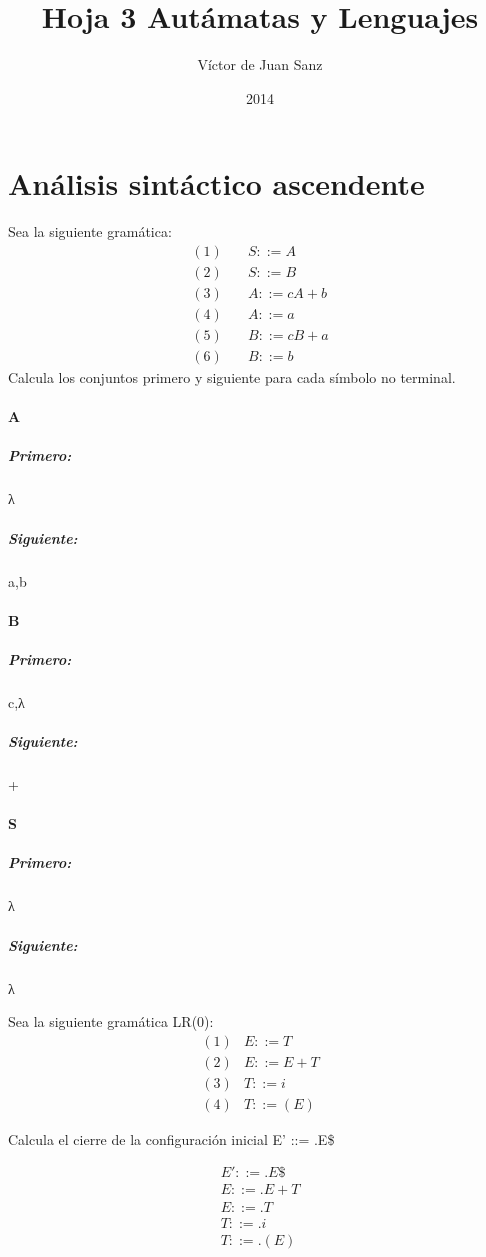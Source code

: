 \documentclass[nochap]{apuntes}
\title{Hoja 3 Autámatas y Lenguajes}
\author{Víctor de Juan Sanz}
\date{2014}
\begin{document}
\maketitle
\section{Análisis sintáctico ascendente}

\begin{problem}[1]
Sea la siguiente gramática:
\begin{align*}
(1)\quad & S ::= A\\
(2)\quad & S ::= B\\
(3)\quad & A ::= cA + b\\
(4)\quad & A ::= a\\
(5)\quad & B ::= cB + a\\
(6)\quad & B ::= b
\end{align*}
Calcula los conjuntos primero y siguiente para cada símbolo no terminal.

\solution

\paragraph{A}
\subparagraph{Primero:} λ
\subparagraph{Siguiente: } {a,b}

\paragraph{B}
\subparagraph{Primero:} {c,λ}
\subparagraph{Siguiente: } {+}

\paragraph{S}
\subparagraph{Primero:} {λ}
\subparagraph{Siguiente: } {λ}
\end{problem}


\begin{problem}[2]
Sea la siguiente gramática LR(0):
\begin{align*}
(1) & E ::= T\\
(2) & E ::= E + T\\
(3) & T ::= i\\
(4) & T ::= (E)
\end{align*}

Calcula el cierre de la configuración inicial E’ ::= .E\$

\solution
\begin{align*}
E' ::= .E\$\\
E ::= .E + T\\
E ::= .T\\
T ::= .i\\
T ::= .(E)
\end{align*}
\end{problem}
\end{document}

